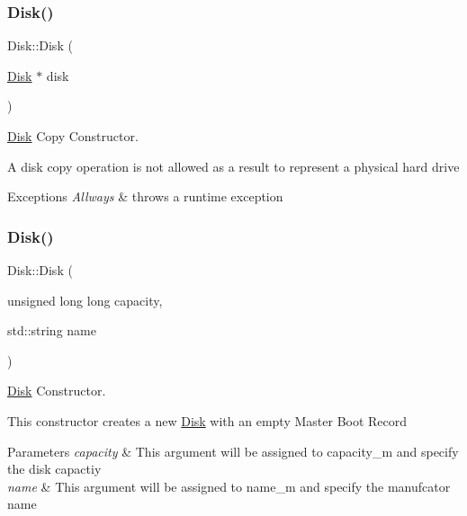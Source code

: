 \subsubsection{\texorpdfstring{Disk()}{Disk()}\hspace{0.1cm}{\footnotesize\ttfamily [2/4]}}
{\footnotesize\ttfamily Disk\+::\+Disk (\begin{DoxyParamCaption}\item[{\mbox{\hyperlink{classcore_1_1disk_1_1_disk}{Disk}} $\ast$}]{disk }\end{DoxyParamCaption})\hspace{0.3cm}{\ttfamily [private]}}



\mbox{\hyperlink{classcore_1_1disk_1_1_disk}{Disk}} Copy Constructor. 

A disk copy operation is not allowed as a result to represent a physical hard drive 
\begin{DoxyExceptions}{Exceptions}
{\em Allways} & throws a runtime exception \\
\hline
\end{DoxyExceptions}
\mbox{\label{classcore_1_1disk_1_1_disk_a1531676df8b095dc6e818458aebf9dee}} 
\subsubsection{\texorpdfstring{Disk()}{Disk()}\hspace{0.1cm}{\footnotesize\ttfamily [3/4]}}
{\footnotesize\ttfamily Disk\+::\+Disk (\begin{DoxyParamCaption}\item[{unsigned long long}]{capacity,  }\item[{std\+::string}]{name }\end{DoxyParamCaption})}



\mbox{\hyperlink{classcore_1_1disk_1_1_disk}{Disk}} Constructor. 

This constructor creates a new \mbox{\hyperlink{classcore_1_1disk_1_1_disk}{Disk}} with an empty Master Boot Record 
\begin{DoxyParams}{Parameters}
{\em capacity} & This argument will be assigned to capacity\+\_\+m and specify the disk capactiy \\
\hline
{\em name} & This argument will be assigned to name\+\_\+m and specify the manufcator name \\
\hline
\end{DoxyParams}
\mbox{\label{classcore_1_1disk_1_1_disk_ad7164897c3af79602e86463065550754}} 
